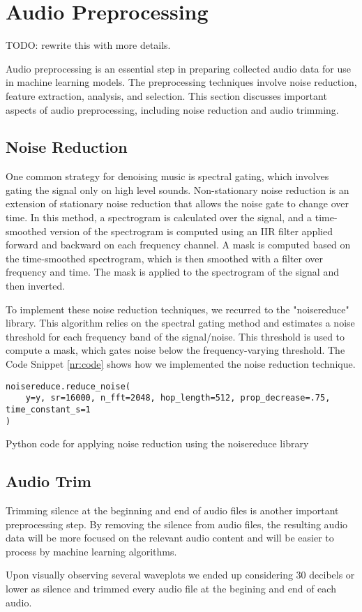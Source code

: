 \section{Audio Preprocessing}
TODO: rewrite this with more details.

Audio preprocessing is an essential step in preparing collected audio data for use in machine learning models. The preprocessing techniques involve noise reduction, feature extraction, analysis, and selection. This section discusses important aspects of audio preprocessing, including noise reduction and audio trimming.

\subsection{Noise Reduction}

One common strategy for denoising music is spectral gating, which involves gating the signal only on high level sounds. Non-stationary noise reduction is an extension of stationary noise reduction that allows the noise gate to change over time. In this method, a spectrogram is calculated over the signal, and a time-smoothed version of the spectrogram is computed using an IIR filter applied forward and backward on each frequency channel. A mask is computed based on the time-smoothed spectrogram, which is then smoothed with a filter over frequency and time. The mask is applied to the spectrogram of the signal and then inverted.

To implement these noise reduction techniques, we recurred to the "noisereduce" library. This algorithm relies on the spectral gating method and estimates a noise threshold for each frequency band of the signal/noise. This threshold is used to compute a mask, which gates noise below the frequency-varying threshold. The Code Snippet \ref{nr:code} shows how we implemented the noise reduction technique.

\begin{listing}[H]
	\begin{verbatim}
noisereduce.reduce_noise(
	y=y, sr=16000, n_fft=2048, hop_length=512, prop_decrease=.75, time_constant_s=1
)
	\end{verbatim}
	\caption{Python code for applying noise reduction using the noisereduce library}
	\label{nr:code}
\end{listing}


\subsection{Audio Trim}

Trimming silence at the beginning and end of audio files is another important preprocessing step. By removing the silence from audio files, the resulting audio data will be more focused on the relevant audio content and will be easier to process by machine learning algorithms.

Upon visually observing several waveplots we ended up considering 30 decibels or lower as silence and trimmed every audio file at the begining and end of each audio.
